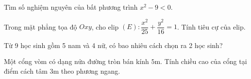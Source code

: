 
\NQuestion Tìm số nghiệm nguyên của bất phương trình $x^2-9<0$.

\NQuestion Trong mặt phẳng tọa độ $Oxy$, cho elip $(E):\dfrac{x^2}{25}+\dfrac{y^2}{16}=1$. Tính tiêu cự của elip.

\NQuestion Từ 9 học sinh gồm 5 nam và 4 nữ, có bao nhiêu cách chọn ra 2 học sinh?

\NQuestion Một cổng vòm có dạng nửa đường tròn bán kính $5$m. Tính chiều cao của cổng tại điểm cách tâm $3$m theo phương ngang.

\begin{center}

\end{center}

